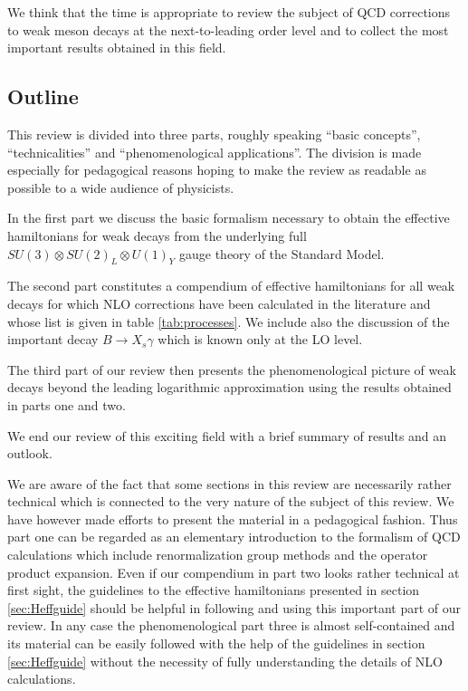 We think that the time is appropriate to review the subject of QCD
corrections to weak meson decays at the next-to-leading order level
and to collect the most important results obtained in this field.

\subsection{Outline}
            \label{sec:intro:outline}
This review is divided into three parts, roughly speaking ``basic
concepts'', ``technicalities'' and ``phenomenological applications''.
The division is made especially for pedagogical reasons hoping to make
the review as readable as possible to a wide audience of physicists.

In the first part we discuss the basic formalism necessary to obtain
the effective hamiltonians for weak decays from the underlying full
$SU(3) \otimes SU(2)_L \otimes U(1)_Y$ gauge theory of the Standard
Model.

The second part constitutes a compendium of effective hamiltonians for
all weak decays for which NLO corrections have been calculated in the
literature and whose list is given in table \ref{tab:processes}. We
include also the discussion of the important decay $B \to X_s \gamma$
which is known only at the LO level.

The third part of our review then presents the phenomenological picture
of weak decays beyond the leading logarithmic approximation using the
results obtained in parts one and two.

We end our review of this exciting field with a brief summary of
results and an outlook.

We are aware of the fact that some sections in this review are
necessarily rather technical which is connected to the very nature of
the subject of this review. We have however made efforts to present the
material in a pedagogical fashion. Thus part one can be regarded as an
elementary introduction to the formalism of QCD calculations which
include renormalization group methods  and the operator product
expansion. Even if our compendium in part two looks rather technical at
first sight, the guidelines to the effective hamiltonians presented in
section \ref{sec:Heffguide} should be helpful in following and using
this important part of our review. In any case the phenomenological part
three is almost self-contained and its material can be easily followed
with the help of the guidelines in section  \ref{sec:Heffguide} without
the necessity of fully understanding the details of NLO calculations.
